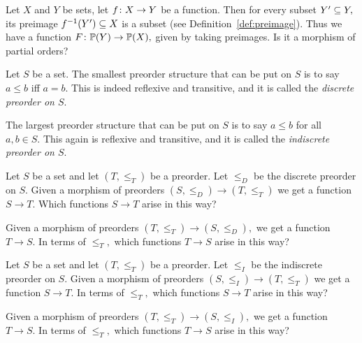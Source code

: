 \documentclass[../main/CT4S-EN-RU]{subfiles}
\begin{document}
\begin{applicationRUS}
\end{applicationRUS}

\begin{exerciseENG}
Let $X$ and $Y$ be sets, let $f\taking X\to Y$ be a function. Then for every subset $Y'\ss Y,$ its preimage $f^\m1(Y')\ss X$ is a subset (see Definition~\ref{def:preimage}). Thus we have a function $F\taking\PP(Y)\to\PP(X),$ given by taking preimages. Is it a morphism of partial orders?
\end{exerciseENG}

\begin{exerciseRUS}
\end{exerciseRUS}

\begin{exampleENG}\label{ex:discrete and indiscrete}
Let $S$ be a set. The smallest preorder structure that can be put on $S$ is to say $a\leq b$ iff $a=b.$ This is indeed reflexive and transitive, and it is called the {\em discrete preorder on $S$}.

The largest preorder structure that can be put on $S$ is to say $a\leq b$ for all $a,b\in S.$ This again is reflexive and transitive, and it is called the {\em indiscrete preorder on $S$}.
\end{exampleENG}

\begin{exampleRUS}\label{ex:discrete and indiscrete}
\end{exampleRUS}

\begin{exerciseENG}
Let $S$ be a set and let $(T,\leq_T)$ be a preorder. Let $\leq_D$ be the discrete preorder on $S.$ Given a morphism of preorders $(S,\leq_D)\to (T,\leq_T)$ we get a function $S\to T.$ 
\sexc Which functions $S\to T$ arise in this way? 
\item Given a morphism of preorders $(T,\leq_T)\to(S,\leq_D),$ we get a function $T\to S.$ In terms of $\leq_T,$ which functions $T\to S$ arise in this way?
\endsexc
\end{exerciseENG}

\begin{exerciseRUS}
\end{exerciseRUS}

\begin{exerciseENG}
Let $S$ be a set and let $(T,\leq_T)$ be a preorder. Let $\leq_I$ be the indiscrete preorder on $S.$ Given a morphism of preorders $(S,\leq_I)\to (T,\leq_T)$ we get a function $S\to T.$ 
\sexc In terms of $\leq_T,$ which functions $S\to T$ arise in this way? 
\item Given a morphism of preorders $(T,\leq_T)\to(S,\leq_I),$ we get a function $T\to S.$ In terms of $\leq_T,$ which functions $T\to S$ arise in this way?
\endsexc
\end{exerciseENG}
\end{document}
